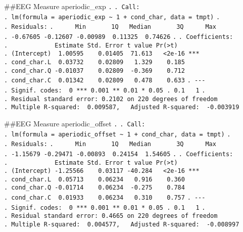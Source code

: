 \documentclass[
]{article}
\begin{document}
\#\#EEG Measure aperiodic\_exp \texttt{.} \texttt{.\ Call:}
\texttt{.\ lm(formula\ =\ aperiodic\_exp\ \textasciitilde{}\ 1\ +\ cond\_char,\ data\ =\ tmpt)}
\texttt{.} \texttt{.\ Residuals:}
\texttt{.\ \ \ \ \ \ Min\ \ \ \ \ \ \ 1Q\ \ \ Median\ \ \ \ \ \ \ 3Q\ \ \ \ \ \ Max}
\texttt{.\ -0.67605\ -0.12607\ -0.00989\ \ 0.11325\ \ 0.74626}
\texttt{.} \texttt{.\ Coefficients:}
\texttt{.\ \ \ \ \ \ \ \ \ \ \ \ \ Estimate\ Std.\ Error\ t\ value\ Pr(\textgreater{}\textbar{}t\textbar{})}
\texttt{.\ (Intercept)\ \ 1.00595\ \ \ \ 0.01405\ \ 71.613\ \ \ \textless{}2e-16\ ***}
\texttt{.\ cond\_char.L\ \ 0.03732\ \ \ \ 0.02809\ \ \ 1.329\ \ \ \ 0.185}
\texttt{.\ cond\_char.Q\ -0.01037\ \ \ \ 0.02809\ \ -0.369\ \ \ \ 0.712}
\texttt{.\ cond\_char.C\ \ 0.01342\ \ \ \ 0.02809\ \ \ 0.478\ \ \ \ 0.633}
\texttt{.\ -\/-\/-}
\texttt{.\ Signif.\ codes:\ \ 0\ \textquotesingle{}***\textquotesingle{}\ 0.001\ \textquotesingle{}**\textquotesingle{}\ 0.01\ \textquotesingle{}*\textquotesingle{}\ 0.05\ \textquotesingle{}.\textquotesingle{}\ 0.1\ \textquotesingle{}\ \textquotesingle{}\ 1}
\texttt{.}
\texttt{.\ Residual\ standard\ error:\ 0.2102\ on\ 220\ degrees\ of\ freedom}
\texttt{.\ Multiple\ R-squared:\ \ 0.009587,\ \ \ Adjusted\ R-squared:\ \ -0.003919}

\#\#EEG Measure aperiodic\_offset \texttt{.} \texttt{.\ Call:}
\texttt{.\ lm(formula\ =\ aperiodic\_offset\ \textasciitilde{}\ 1\ +\ cond\_char,\ data\ =\ tmpt)}
\texttt{.} \texttt{.\ Residuals:}
\texttt{.\ \ \ \ \ \ Min\ \ \ \ \ \ \ 1Q\ \ \ Median\ \ \ \ \ \ \ 3Q\ \ \ \ \ \ Max}
\texttt{.\ -1.15679\ -0.29471\ -0.00893\ \ 0.24154\ \ 1.54605}
\texttt{.} \texttt{.\ Coefficients:}
\texttt{.\ \ \ \ \ \ \ \ \ \ \ \ \ Estimate\ Std.\ Error\ t\ value\ Pr(\textgreater{}\textbar{}t\textbar{})}
\texttt{.\ (Intercept)\ -1.25566\ \ \ \ 0.03117\ -40.284\ \ \ \textless{}2e-16\ ***}
\texttt{.\ cond\_char.L\ \ 0.05713\ \ \ \ 0.06234\ \ \ 0.916\ \ \ \ 0.360}
\texttt{.\ cond\_char.Q\ -0.01714\ \ \ \ 0.06234\ \ -0.275\ \ \ \ 0.784}
\texttt{.\ cond\_char.C\ \ 0.01933\ \ \ \ 0.06234\ \ \ 0.310\ \ \ \ 0.757}
\texttt{.\ -\/-\/-}
\texttt{.\ Signif.\ codes:\ \ 0\ \textquotesingle{}***\textquotesingle{}\ 0.001\ \textquotesingle{}**\textquotesingle{}\ 0.01\ \textquotesingle{}*\textquotesingle{}\ 0.05\ \textquotesingle{}.\textquotesingle{}\ 0.1\ \textquotesingle{}\ \textquotesingle{}\ 1}
\texttt{.}
\texttt{.\ Residual\ standard\ error:\ 0.4665\ on\ 220\ degrees\ of\ freedom}
\texttt{.\ Multiple\ R-squared:\ \ 0.004577,\ \ \ Adjusted\ R-squared:\ \ -0.008997}
\end{document}
